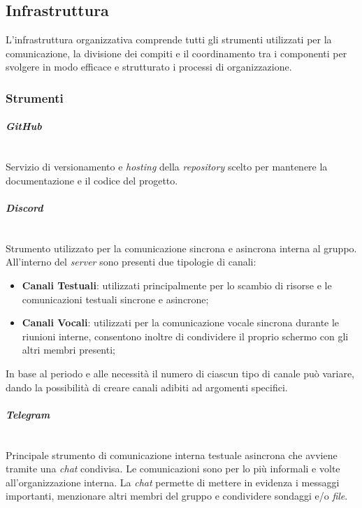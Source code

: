 \documentclass[5pt]{article}
\begin{document}
\subsection{Infrastruttura}
L'infrastruttura organizzativa comprende tutti gli strumenti utilizzati per la comunicazione, la divisione dei compiti e il coordinamento tra i componenti per svolgere in modo efficace e strutturato i processi di organizzazione.

\subsubsection{Strumenti}
\paragraph{\textit{GitHub}}~\\
Servizio di versionamento e \textit{hosting} della \textit{repository} scelto per mantenere la documentazione e il codice del progetto.

\paragraph{\textit{Discord}}~\\
Strumento utilizzato per la comunicazione sincrona e asincrona interna al gruppo. All'interno del \textit{server} sono presenti due tipologie di canali:
\begin{itemize}
    \item\textbf{Canali Testuali}: utilizzati principalmente per lo scambio di risorse e le comunicazioni testuali sincrone e asincrone;
    \item\textbf{Canali Vocali}: utilizzati per la comunicazione vocale sincrona durante le riunioni interne, consentono inoltre di condividere il proprio schermo con gli altri membri presenti;
\end{itemize}
In base al periodo e alle necessità il numero di ciascun tipo di canale può variare, dando la possibilità di creare canali adibiti ad argomenti specifici.

\paragraph{\textit{Telegram}}~\\
Principale strumento di comunicazione interna testuale asincrona che avviene tramite una \textit{chat} condivisa. Le comunicazioni sono per lo più informali e volte all'organizzazione interna. La \textit{chat} permette di mettere in evidenza i messaggi importanti, menzionare altri membri del gruppo e condividere sondaggi e/o \textit{file}.
\end{document}
